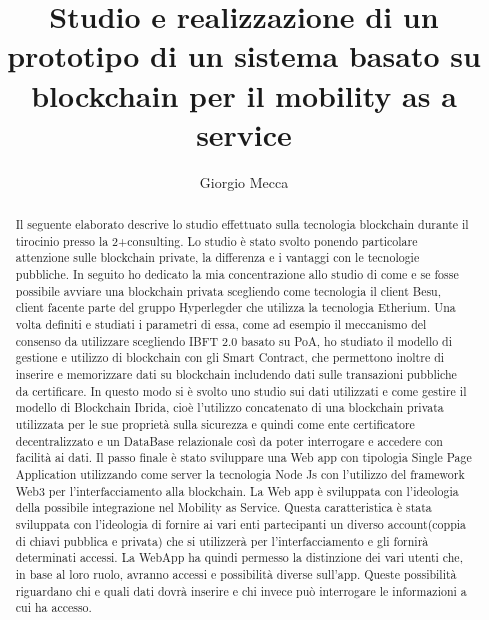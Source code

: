 \documentclass[12pt]{report}
\begin{document}
\author{Giorgio Mecca}
\title{Studio e realizzazione di un prototipo di un sistema basato su blockchain per il mobility as a service}
\maketitle

\begin{abstract} 
Il seguente elaborato descrive lo studio effettuato sulla tecnologia blockchain durante il tirocinio presso la 2+consulting. Lo studio è stato svolto ponendo particolare attenzione sulle blockchain private, la differenza e i vantaggi con le tecnologie pubbliche. In seguito ho dedicato la mia concentrazione allo studio di come e se fosse possibile avviare una blockchain privata scegliendo come tecnologia il client Besu, client facente parte del gruppo Hyperlegder che utilizza la tecnologia Etherium. Una volta definiti e studiati i parametri di essa, come ad esempio il meccanismo del consenso da utilizzare scegliendo IBFT 2.0 basato su PoA, ho studiato il modello di gestione e utilizzo di blockchain con gli Smart Contract, che permettono inoltre di inserire e memorizzare dati su blockchain includendo dati sulle transazioni pubbliche da certificare. In questo modo si è svolto uno studio sui dati utilizzati e come gestire il modello di Blockchain Ibrida, cioè l'utilizzo concatenato di una blockchain privata utilizzata per le sue proprietà sulla sicurezza e quindi come ente certificatore decentralizzato e un DataBase relazionale così da poter interrogare e accedere con facilità ai dati. Il passo finale è stato sviluppare una Web app con tipologia Single Page Application utilizzando come server la tecnologia Node Js con l'utilizzo del framework Web3 per l'interfacciamento alla blockchain. La Web app è sviluppata con l'ideologia della possibile integrazione nel Mobility as Service. Questa caratteristica è stata sviluppata con l'ideologia di fornire ai vari enti partecipanti un diverso account(coppia di chiavi pubblica e privata) che si utilizzerà per l'interfacciamento e gli fornirà determinati accessi. La WebApp ha quindi permesso la distinzione dei vari utenti che, in base al loro ruolo, avranno accessi e possibilità diverse sull'app. Queste possibilità riguardano chi e quali dati dovrà inserire e chi invece può interrogare le informazioni a cui ha accesso.
\end{abstract}

\tableofcontents
\end{document}
